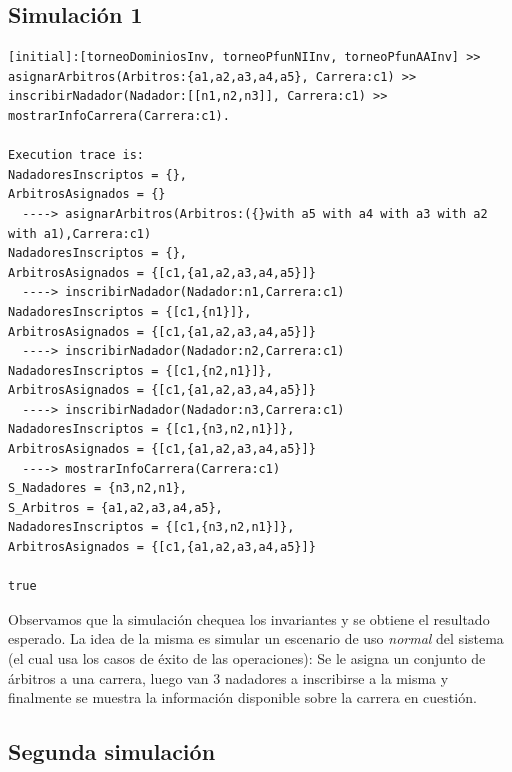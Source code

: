 \documentclass{article}
\begin{document}
\subsection*{Simulación 1}

\begin{verbatim}
[initial]:[torneoDominiosInv, torneoPfunNIInv, torneoPfunAAInv] >>
asignarArbitros(Arbitros:{a1,a2,a3,a4,a5}, Carrera:c1) >>
inscribirNadador(Nadador:[[n1,n2,n3]], Carrera:c1) >>
mostrarInfoCarrera(Carrera:c1).

Execution trace is:
NadadoresInscriptos = {},  
ArbitrosAsignados = {}
  ----> asignarArbitros(Arbitros:({}with a5 with a4 with a3 with a2 with a1),Carrera:c1)
NadadoresInscriptos = {},  
ArbitrosAsignados = {[c1,{a1,a2,a3,a4,a5}]}
  ----> inscribirNadador(Nadador:n1,Carrera:c1)
NadadoresInscriptos = {[c1,{n1}]},  
ArbitrosAsignados = {[c1,{a1,a2,a3,a4,a5}]}
  ----> inscribirNadador(Nadador:n2,Carrera:c1)
NadadoresInscriptos = {[c1,{n2,n1}]},  
ArbitrosAsignados = {[c1,{a1,a2,a3,a4,a5}]}
  ----> inscribirNadador(Nadador:n3,Carrera:c1)
NadadoresInscriptos = {[c1,{n3,n2,n1}]},  
ArbitrosAsignados = {[c1,{a1,a2,a3,a4,a5}]}
  ----> mostrarInfoCarrera(Carrera:c1)
S_Nadadores = {n3,n2,n1},  
S_Arbitros = {a1,a2,a3,a4,a5},  
NadadoresInscriptos = {[c1,{n3,n2,n1}]},  
ArbitrosAsignados = {[c1,{a1,a2,a3,a4,a5}]}

true
\end{verbatim}

Observamos que la simulación chequea los invariantes y se obtiene el resultado esperado. La idea de la misma es simular 
un escenario de uso \textit{normal} del sistema (el cual usa los casos de
éxito de las operaciones): Se le asigna un conjunto de árbitros a una carrera, luego van 3 nadadores a inscribirse a la misma y finalmente se muestra la información disponible
sobre la carrera en cuestión.

\subsection*{Segunda simulación}
\end{document}
